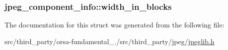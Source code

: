 \subsubsection[{width\+\_\+in\+\_\+blocks}]{ jpeg\+\_\+component\+\_\+info\+::width\+\_\+in\+\_\+blocks}\label{structjpeg__component__info_a059454e8192effeabc6eab34e2ad198d}


The documentation for this struct was generated from the following file\+:\begin{DoxyCompactItemize}
\item 
src/third\+\_\+party/orsa-\/fundamental\+\_./src/third\+\_\+party/jpeg/\hyperlink{jpeglib_8h}{jpeglib.\+h}\end{DoxyCompactItemize}
